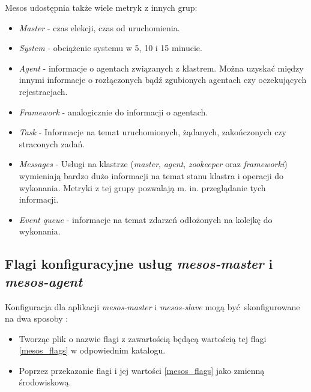 \documentclass[10pt,a4paper,titlepage,twoside]{report}
\begin{document}
Mesos udostępnia także wiele metryk z innych grup:
\begin{itemize}
\item \textit{Master} - czas elekcji, czas od uruchomienia.
\item \textit{System} - obciążenie systemu w 5, 10 i 15 minucie.
\item \textit{Agent} - informacje o agentach związanych z klastrem. Można uzyskać między innymi informacje o rozłączonych bądź zgubionych agentach czy oczekujących rejestracjach.
\item \textit{Framework} - analogicznie do informacji o agentach.
\item \textit{Task} - Informacje na temat uruchomionych, żądanych, zakończonych czy straconych zadań.
\item \textit{Messages} - Usługi na klastrze (\textit{master}, \textit{agent}, \textit{zookeeper} oraz \textit{frameworki}) wymieniają bardzo dużo informacji na temat stanu klastra i operacji do wykonania. Metryki z tej grupy pozwalają m. in. przeglądanie tych informacji.
\item \textit{Event queue} - informacje na temat zdarzeń odłożonych na kolejkę do wykonania.
\end{itemize}

\subsection{Flagi konfiguracyjne usług \textit{mesos-master} i \textit{mesos-agent}}
Konfiguracja dla aplikacji \textit{mesos-master} i \textit{mesos-slave} mogą być skonfigurowane na dwa sposoby \cite{ad34}:
\begin{itemize}
\item Tworząc plik o nazwie flagi z zawartością będącą wartością tej flagi \ref{mesos_flags} w odpowiednim katalogu.
\item Poprzez przekazanie flagi i jej wartości \ref{mesos_flags} jako zmienną środowiskową.
\end{itemize}
\end{document}
